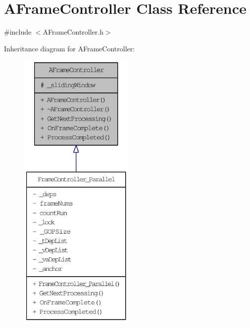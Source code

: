 \hypertarget{class_a_frame_controller}{
\section{AFrameController Class Reference}
\label{class_a_frame_controller}
}


{\ttfamily \#include $<$AFrameController.h$>$}



Inheritance diagram for AFrameController:\nopagebreak
\begin{figure}[H]
\begin{center}
\leavevmode
\includegraphics[height=400pt]{class_a_frame_controller__inherit__graph}
\end{center}
\end{figure}


